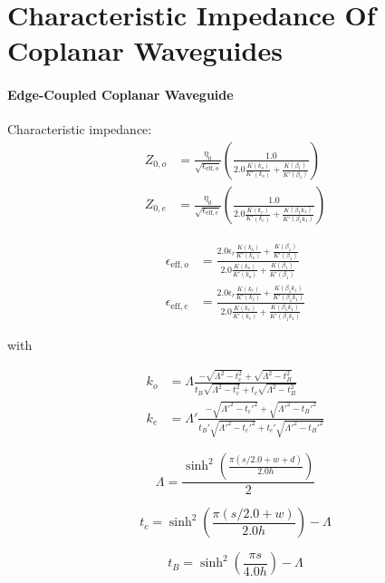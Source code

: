 \section{Characteristic Impedance Of Coplanar Waveguides} \label{app:waveguides}
\paragraph{Edge-Coupled Coplanar Waveguide}

Characteristic impedance\cite[~p197-198]{wadell}: 
\begin{align}
	Z_{0,o} &= \frac{\eta_0}{\sqrt{\epsilon_{\text{eff},o}}} \left( \frac{1.0}{2.0 \frac{K(k_o)}{K'(k_o)} + \frac{K(\beta_1)}{K'(\beta_1)}}\right)\\
	Z_{0,e} &= \frac{\eta_0}{\sqrt{\epsilon_{\text{eff},e}}} \left( \frac{1.0}{2.0 \frac{K(k_e)}{K'(k_e)} + \frac{K(\beta_1 k_1)}{K'(\beta_1 k_1)}}\right)
\end{align}    



\begin{align}
	\epsilon_{\text{eff},o} &= \frac{2.0 \epsilon_r \frac{K(k_o)}{K'(k_o)} + \frac{K(\beta_1)}{K'(\beta_1)}}{2.0 \frac{K(k_o)}{K'(k_o)} + \frac{K(\beta_1)}{K'(\beta_1)}}\\
	\epsilon_{\text{eff},e} &= \frac{2.0 \epsilon_r \frac{K(k_e)}{K'(k_e)} + \frac{K(\beta_1 k_1)}{K'(\beta_1 k_1)}}{2.0 \frac{K(k_e)}{K'(k_e)} + \frac{K(\beta_1 k_1)}{K'(\beta_1 k_1)}}
\end{align}

with

\begin{align}
	k_o &= \Lambda \frac{-\sqrt{\Lambda^2 - t_c^2} + \sqrt{\Lambda^2 - t_B^2}}{t_B\sqrt{\Lambda^2 - t_c^2} + t_c \sqrt{\Lambda^2 - t_B^2}}\\
	k_e &= \Lambda' \frac{-\sqrt{\Lambda'^2 - t_c'^2} + \sqrt{\Lambda'^2 - t_B'^2}}{t_B'\sqrt{\Lambda'^2 - t_c'^2} + t_c' \sqrt{\Lambda'^2 - t_B'^2}}
\end{align}


\begin{equation}
	\Lambda = \frac{\sinh^2 \left( \frac{\pi (s/2.0 + w + d)}{2.0 h} \right) }{2}
\end{equation}

\begin{equation}
	t_c = \sinh^2 \left( \frac{\pi (s/2.0 + w)}{2.0 h} \right) - \Lambda
\end{equation}

\begin{equation}
	t_B = \sinh^2 \left( \frac{\pi s}{4.0 h} \right) - \Lambda
\end{equation}


